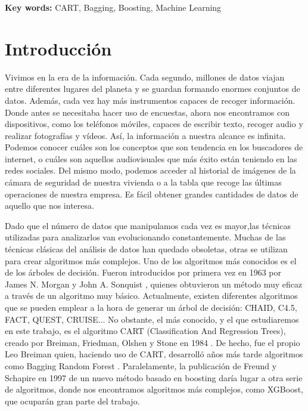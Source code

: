\documentclass[12pt,twoside]{article}
\begin{document}
\textbf{Key words:} CART, Bagging, Boosting, Machine Learning



\newpage



\tableofcontents



\newpage



\section{Introducción}

Vivimos en la era de la información. Cada segundo, millones de datos viajan entre diferentes lugares del planeta y se guardan formando enormes conjuntos de datos. Además, cada vez hay más instrumentos capaces de recoger información. Donde antes se necesitaba hacer uso de encuestas, ahora nos encontramos con dispositivos, como los teléfonos móviles, capaces de escribir texto, recoger audio y realizar fotografías y vídeos. Así, la información a nuestra alcance es infinita. Podemos conocer cuáles son los conceptos que son tendencia en los buscadores de internet, o cuáles son aquellos audiovisuales que más éxito están teniendo en las redes sociales. Del mismo modo, podemos acceder al historial de imágenes de la cámara de seguridad de nuestra vivienda o a la tabla que recoge las últimas operaciones de nuestra empresa. Es fácil obtener grandes cantidades de datos de aquello que nos interesa.

Dado que el número de datos que manipulamos cada vez es mayor,las técnicas utilizadas para analizarlos van evolucionando constantemente. Muchas de las técnicas clásicas del análisis de datos han quedado obsoletas, otras se utilizan para crear algoritmos más complejos. Uno de los algoritmos más conocidos es el de los árboles de decisión. Fueron introducidos por primera vez en 1963 por James N. Morgan y John A. Sonquist \cite{MO01}, quienes obtuvieron un método muy eficaz a través de un algoritmo muy básico. Actualmente, existen diferentes algoritmos que se pueden emplear a la hora de generar un árbol de decisión: CHAID, C4.5, FACT, QUEST, CRUISE... No obstante, el más conocido, y el que estudiaremos en este trabajo, es el algoritmo CART (Classification And Regression Trees), creado por Breiman, Friedman, Olshen y Stone en 1984 \cite{BR03}. De hecho, fue el propio Leo Breiman quien, haciendo uso de CART, desarrolló años más tarde algoritmos como Bagging \cite{BR01} Random Forest \cite{BR02}. Paralelamente, la publicación de Freund y Schapire en 1997 \cite{FR01} de un nuevo método basado en boosting daría lugar a otra serie de algoritmos, donde nos encontramos algoritmos más complejos, como XGBoost, que ocuparán gran parte del trabajo.
\end{document}
